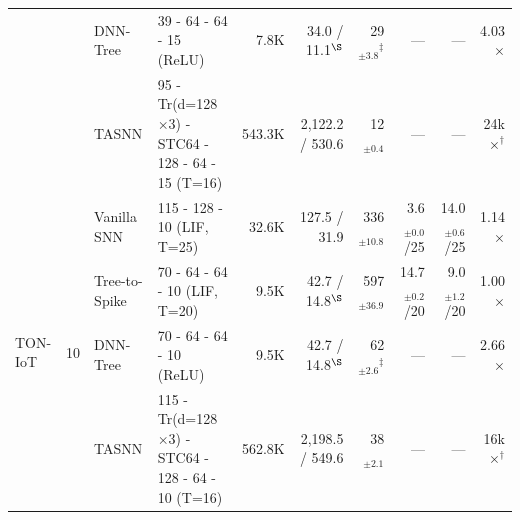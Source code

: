 \begin{table}[!ht]
{\begin{tabular}{l c l l r r r r r r}
& & DNN-Tree      & 39 - 64 - 64 - 15 (ReLU) & 7.8K & 34.0 / 11.1$^{\S}$ & 29$_{\pm3.8}$$^\ddagger$ & --- & --- & 4.03$\times$ \\
& & TASNN         & 95 - Tr(d=128$\times$3) - STC64 - 128 - 64 - 15 (T=16) & 543.3K & 2,122.2 / 530.6 & 12$_{\pm0.4}$ & --- & --- & 24k$\times$$^\dagger$ \\
\midrule
\multirow{4}{*}{TON-IoT} & \multirow{4}{*}{10}
  & Vanilla SNN   & 115 - 128 - 10 (LIF, T=25) & 32.6K & 127.5 / 31.9 & 336$_{\pm10.8}$ & 3.6$_{\pm0.0}$/25 & 14.0$_{\pm0.6}$/25 & 1.14$\times$ \\
& & Tree-to-Spike & 70 - 64 - 64 - 10 (LIF, T=20) & 9.5K & 42.7 / 14.8$^{\S}$ & 597$_{\pm36.9}$ & 14.7$_{\pm0.2}$/20 & 9.0$_{\pm1.2}$/20 & 1.00$\times$ \\
& & DNN-Tree      & 70 - 64 - 64 - 10 (ReLU) & 9.5K & 42.7 / 14.8$^{\S}$ & 62$_{\pm2.6}$$^\ddagger$ & --- & --- & 2.66$\times$ \\
& & TASNN         & 115 - Tr(d=128$\times$3) - STC64 - 128 - 64 - 10 (T=16) & 562.8K & 2,198.5 / 549.6 & 38$_{\pm2.1}$ & --- & --- & 16k$\times$$^\dagger$ \\
\bottomrule
\end{tabular}}
\end{table}
